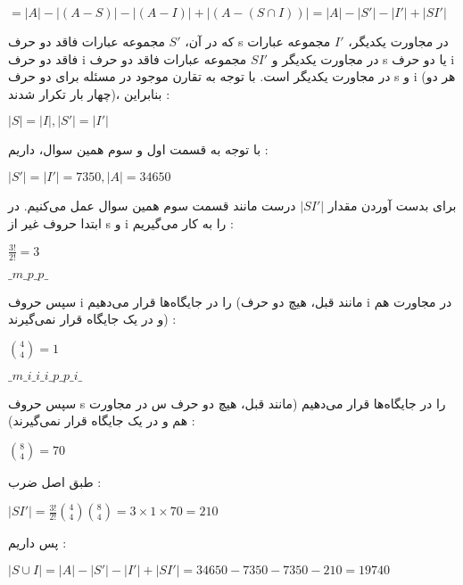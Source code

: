 \begin{problem}
\begin{enumerate}
{\begin{center}
            $= |A| - |(A - S)| - |(A - I)| + |(A - (S \cap I))| = |A| - |S'| - |I'| + |SI'|$
        \end{center}
        که در آن،
        $S'$
        مجموعه عبارات فاقد دو حرف
        s
        در مجاورت یکدیگر،
        $I'$
        مجموعه عبارات فاقد دو حرف
        i
        در مجاورت یکدیگر و
        $SI'$
        مجموعه عبارات فاقد دو حرف
        s
        یا دو حرف
        i
        در مجاورت یکدیگر است.
        با توجه به تقارن موجود در مسئله برای دو حرف
        s
        و
        i
        (هر دو چهار بار تکرار شدند)،
        بنابراین :    
        \begin{center}
            $|S| = |I|, |S'| = |I'|$
        \end{center}
        \p
        با توجه به قسمت اول و سوم همین سوال، داریم :
        \begin{center}
            $|S'| = |I'| = 7350, |A| = 34650$
        \end{center}
        \p
        برای بدست آوردن مقدار 
        $|SI'|$
        درست مانند قسمت سوم همین سوال عمل می‌کنیم. در ابتدا
        حروف غیر از
        s و i
        را به کار می‌گیریم :
        \begin{center}
            $\frac{3!}{2!} = 3$
    
            $\_ m \_ p \_ p \_$
        \end{center}
        سپس حروف
        i
        را در جایگاه‌ها قرار می‌دهیم
        (مانند قبل، هیچ دو حرف
        i
        در مجاورت هم و در یک جایگاه قرار نمی‌گیرند) :
        \begin{center}
            $\binom{4}{4} = 1$
    
            $\_ m \_ i \_ i \_ i \_ p \_ p \_ i \_$
        \end{center}
        سپس حروف
        s
        را در جایگاه‌ها قرار می‌دهیم
        (مانند قبل، هیچ دو حرف
        س
        در مجاورت هم و در یک جایگاه قرار نمی‌گیرند) :
        \begin{center}
            $\binom{8}{4} = 70$
        \end{center}
        \p
        طبق اصل ضرب :
        \begin{center}
            $|SI'| = \frac{3!}{2!} \binom{4}{4} \binom{8}{4} = 3 \times 1 \times 70 = 210$
        \end{center}
        پس داریم :
        \begin{center}
            $|S \cup I| = |A| - |S'| - |I'| + |SI'| = 34650 - 7350 - 7350 - 210 = 19740$
        \end{center}
      }
  
    \end{enumerate}
\end{problem}